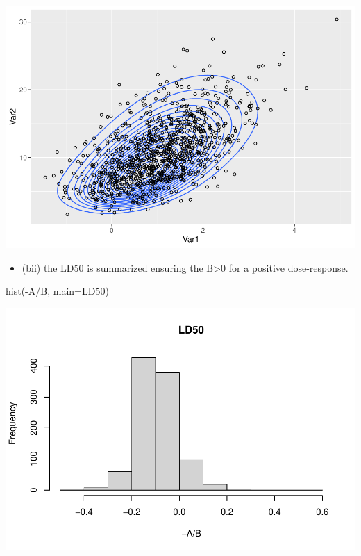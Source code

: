 \documentclass[
]{book}
\newenvironment{Shaded}{\begin{snugshade}}{\end{snugshade}}
\newcommand{\AttributeTok}[1]{\textcolor[rgb]{0.77,0.63,0.00}{#1}}
\newcommand{\FunctionTok}[1]{\textcolor[rgb]{0.00,0.00,0.00}{#1}}
\newcommand{\NormalTok}[1]{#1}
\newcommand{\SpecialCharTok}[1]{\textcolor[rgb]{0.00,0.00,0.00}{#1}}
\newcommand{\StringTok}[1]{\textcolor[rgb]{0.31,0.60,0.02}{#1}}
\providecommand{\tightlist}{%
  \setlength{\itemsep}{0pt}\setlength{\parskip}{0pt}}
\theoremstyle{definition}
\theoremstyle{definition}
\theoremstyle{definition}
\theoremstyle{definition}
\theoremstyle{remark}
\begin{document}
\includegraphics{_main_files/figure-latex/q11-1.pdf}

\begin{itemize}
\tightlist
\item
  (bii) the LD50 is summarized ensuring the B\textgreater0 for a positive dose-response.
\end{itemize}

\begin{Shaded}
\begin{Highlighting}[]
\FunctionTok{hist}\NormalTok{(}\SpecialCharTok{{-}}\NormalTok{A}\SpecialCharTok{/}\NormalTok{B, }\AttributeTok{main=}\StringTok{\textquotesingle{}LD50\textquotesingle{}}\NormalTok{)}
\end{Highlighting}
\end{Shaded}

\includegraphics{_main_files/figure-latex/unnamed-chunk-49-1.pdf}
\end{document}
